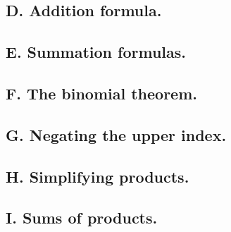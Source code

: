 \documentclass{article}
\begin{document}
\subsection*{D. Addition formula.}
\subsection*{E. Summation formulas.}
\subsection*{F. The binomial theorem.}
\subsection*{G. Negating the upper index.}
\subsection*{H. Simplifying products.}
\subsection*{I. Sums of products.}
\end{document}
